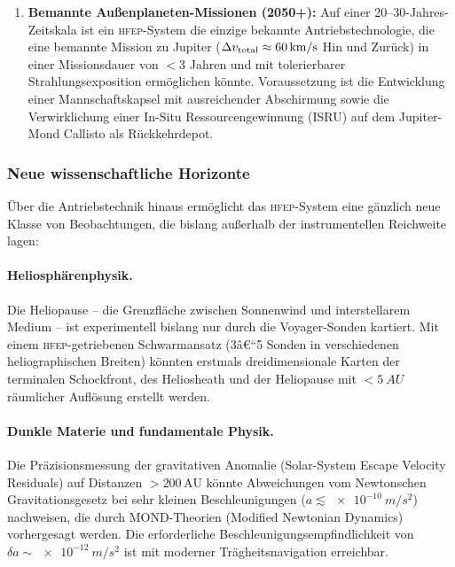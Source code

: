 ﻿\documentclass[a4paper,12pt,twoside]{article}
\theoremstyle{plain}
\theoremstyle{definition}
\theoremstyle{remark}
\newcommand{\Dv}{\Delta v}
\newcommand{\HFEP}{\textsc{hfep}}
\begin{document}
\begin{enumerate}
		\item \textbf{Bemannte Außenplaneten-Missionen (2050+):}
		Auf einer 20--30-Jahres-Zeitskala ist ein \HFEP-System die einzige
		bekannte Antriebstechnologie, die eine bemannte Mission zu Jupiter
		($\Dv_{\rm total}\approx\SI{60}{km/s}$ Hin und Zurück) in einer
		Missionsdauer von $<3$ Jahren und mit tolerierbarer Strahlungsexposition
		ermöglichen könnte. Voraussetzung ist die Entwicklung einer Mannschaftskapsel
		mit ausreichender Abschirmung sowie die Verwirklichung einer In-Situ
		Ressourcengewinnung (ISRU) auf dem Jupiter-Mond Callisto als Rückkehrdepot.
	\end{enumerate}

	\subsubsection{Neue wissenschaftliche Horizonte}

	Über die Antriebstechnik hinaus ermöglicht das \HFEP-System eine gänzlich
	neue Klasse von Beobachtungen, die bislang außerhalb der instrumentellen
	Reichweite lagen:

	\paragraph{Heliosphärenphysik.}
	Die Heliopause -- die Grenzfläche zwischen Sonnenwind und interstellarem
	Medium -- ist experimentell bislang nur durch die Voyager-Sonden kartiert.
	Mit einem \HFEP-getriebenen Schwarmansatz (3â€“5 Sonden in verschiedenen
	heliographischen Breiten) könnten erstmals dreidimensionale Karten der
	terminalen Schockfront, des Heliosheath und der Heliopause mit
	$<\SI{5}{AU}$ räumlicher Auflösung erstellt werden.

	\paragraph{Dunkle Materie und fundamentale Physik.}
	Die Präzisionsmessung der gravitativen Anomalie (Solar-System Escape
	Velocity Residuals) auf Distanzen $>200\,\mathrm{AU}$ könnte Abweichungen
	vom Newtonschen Gravitationsgesetz bei sehr kleinen Beschleunigungen
	($a \lesssim \SI{e-10}{m/s^2}$) nachweisen, die durch MOND-Theorien
	(Modified Newtonian Dynamics) vorhergesagt werden. Die erforderliche
	Beschleunigungsempfindlichkeit von $\delta a \sim\SI{e-12}{m/s^2}$ ist mit
	moderner Trägheitsnavigation erreichbar.
\end{document}
